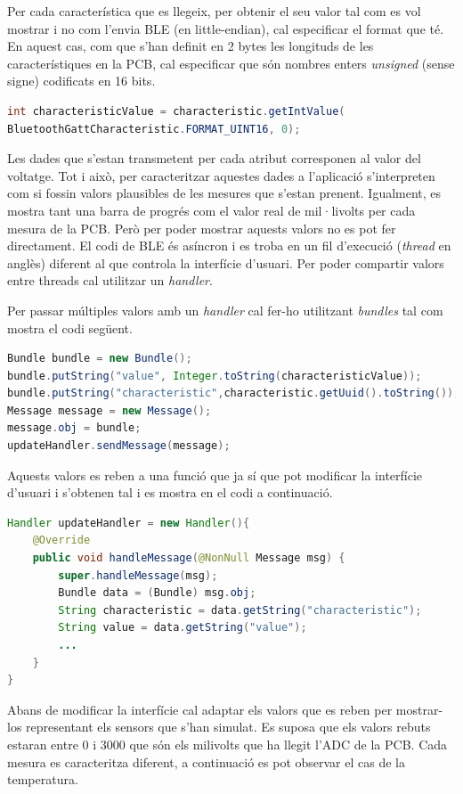 Per cada característica que es llegeix, per obtenir el seu valor tal com es vol mostrar i no com l'envia BLE (en little-endian), cal especificar el format que té.
En aquest cas, com que s'han definit en 2 bytes les longituds de les característiques en la PCB, cal especificar que són nombres enters \textit{unsigned} (sense signe) codificats en 16 bits.

\begin{lstlisting}[language=java]
int characteristicValue = characteristic.getIntValue(
BluetoothGattCharacteristic.FORMAT_UINT16, 0);
\end{lstlisting}

Les dades que s'estan transmetent per cada atribut corresponen al valor del voltatge.
Tot i això, per caracteritzar aquestes dades a l'aplicació s'interpreten com si fossin valors plausibles de les mesures que s'estan prenent.
Igualment, es mostra tant una barra de progrés com el valor real de mil·livolts per cada mesura de la PCB.
Però per poder mostrar aquests valors no es pot fer directament.
El codi de BLE és asíncron i es troba en un fil d'execució (\textit{thread} en anglès) diferent al que controla la interfície d'usuari.
Per poder compartir valors entre threads cal utilitzar un \textit{handler}.

Per passar múltiples valors amb un \textit{handler} cal fer-ho utilitzant \textit{bundles} tal com mostra el codi següent.
\begin{lstlisting}[language=java]
Bundle bundle = new Bundle();
bundle.putString("value", Integer.toString(characteristicValue));
bundle.putString("characteristic",characteristic.getUuid().toString());
Message message = new Message();
message.obj = bundle;
updateHandler.sendMessage(message);
\end{lstlisting}

Aquests valors es reben a una funció que ja sí que pot modificar la interfície d'usuari i s'obtenen tal i es mostra en el codi a continuació.

\begin{lstlisting}[language=java]
 Handler updateHandler = new Handler(){
	@Override
	public void handleMessage(@NonNull Message msg) {
		super.handleMessage(msg);
		Bundle data = (Bundle) msg.obj;
		String characteristic = data.getString("characteristic");
		String value = data.getString("value");
		...
	}
}
\end{lstlisting}

Abans de modificar la interfície cal adaptar els valors que es reben per mostrar-los representant els sensors que s'han simulat.
Es suposa que els valors rebuts estaran entre 0 i 3000 que són els milivolts que ha llegit l'ADC de la PCB.
Cada mesura es caracteritza diferent, a continuació es pot observar el cas de la temperatura.

